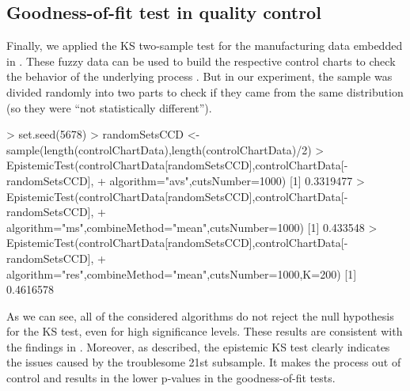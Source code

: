 \subsection{Goodness-of-fit test in quality control}
Finally, we applied the KS two-sample test for the manufacturing data embedded in .
These fuzzy data can be used to build the respective control charts to check the behavior of the underlying process \citep{FARAZ20102684}.
But in our experiment, the sample was divided randomly into two parts to check if they came from the same distribution (so they were ``not statistically different'').
\begin{example}
> set.seed(5678)
> randomSetsCCD <- sample(length(controlChartData),length(controlChartData)/2)
> EpistemicTest(controlChartData[randomSetsCCD],controlChartData[-randomSetsCCD],
+  algorithm="avs",cutsNumber=1000)
[1] 0.3319477
> EpistemicTest(controlChartData[randomSetsCCD],controlChartData[-randomSetsCCD],
+  algorithm="ms",combineMethod="mean",cutsNumber=1000)
[1] 0.433548
> EpistemicTest(controlChartData[randomSetsCCD],controlChartData[-randomSetsCCD],
+  algorithm="res",combineMethod="mean",cutsNumber=1000,K=200)
[1] 0.4616578
\end{example}
As we can see, all of the considered algorithms do not reject the null hypothesis for the KS test, even for high significance levels.
These results are consistent with the findings in \cite{FARAZ20102684}.
Moreover, as \cite{PGMR2024AMS} described, the epistemic KS test clearly indicates the issues caused by the troublesome 21st subsample.
It makes the process out of control and results in the lower p-values in the goodness-of-fit tests.
